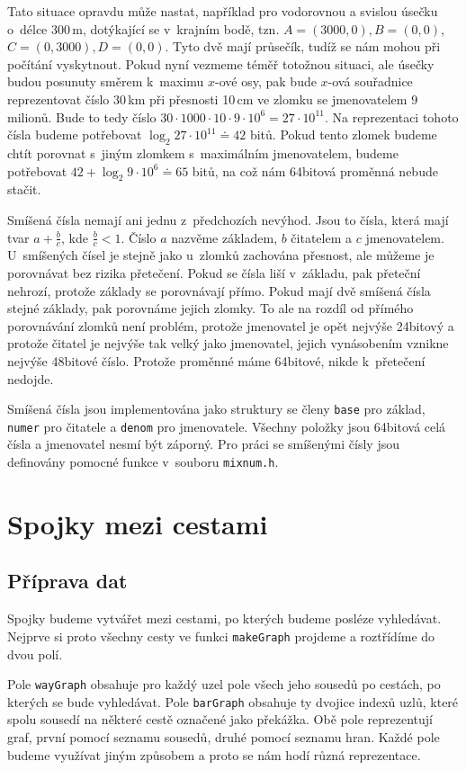 Tato situace opravdu může nastat, například pro vodorovnou a svislou úsečku
o~délce 300\,m, dotýkající se v~krajním bodě, tzn. $A=(3000,0),B=(0,0)$,
$C=(0,3000),D=(0,0)$. Tyto dvě mají průsečík, tudíž se nám mohou při počítání
vyskytnout. Pokud nyní vezmeme téměř totožnou situaci, ale úsečky budou posunuty
směrem k~maximu $x$-ové osy, pak bude $x$-ová souřadnice reprezentovat číslo
30\,km při přesnosti 10\,cm ve zlomku se jmenovatelem 9 milionů. Bude to tedy
číslo $30\cdot1000\cdot10\cdot9\cdot10^6=27 \cdot 10^{11}$. Na reprezentaci tohoto
čísla budeme potřebovat $\log_2 27\cdot 10^{11} \doteq 42$ bitů. Pokud tento
zlomek budeme chtít porovnat s~jiným zlomkem s~maximálním jmenovatelem, budeme
potřebovat $42 + \log_2 9\cdot 10^{6} \doteq 65$ bitů, na což nám 64bitová proměnná
nebude stačit.

{\tuc Smíšená čísla} nemají ani jednu z~předchozích nevýhod. Jsou to čísla,
která mají tvar $a+\frac{b}{c}$, kde $\frac{b}{c}<1$. Číslo $a$ nazvěme
základem, $b$ čitatelem a $c$ jmenovatelem. U~smíšených čísel je stejně jako
u~zlomků zachována přesnost, ale můžeme je porovnávat bez rizika přetečení.
Pokud se čísla liší v~základu, pak přeteční nehrozí, protože základy se
porovnávají přímo. Pokud mají dvě smíšená čísla stejné základy, pak porovnáme
jejich zlomky. To ale na rozdíl od přímého porovnávání zlomků není problém,
protože jmenovatel je opět nejvýše 24bitový a protože čitatel je nejvýše tak
velký jako jmenovatel, jejich vynásobením vznikne nejvýše 48bitové číslo.
Protože proměnné máme 64bitové, nikde k~přetečení nedojde.

Smíšená čísla jsou implementována jako struktury se členy \verb|base| pro
základ, \verb|numer| pro čitatele a \verb|denom| pro jmenovatele. Všechny
položky jsou 64bitová celá čísla a jmenovatel nesmí být záporný. Pro práci se
smíšenými čísly jsou definovány pomocné funkce v~souboru \verb|mixnum.h|.

\section{Spojky mezi cestami}
\subsection{Příprava dat}
Spojky budeme vytvářet mezi cestami, po kterých budeme posléze vyhledávat.
Nejprve si proto všechny cesty ve funkci \verb|makeGraph| projdeme a roztřídíme
do dvou polí. 

Pole \verb|wayGraph| obsahuje pro každý uzel pole všech jeho sousedů po cestách,
po kterých se bude vyhledávat. Pole \verb|barGraph| obsahuje ty dvojice indexů
uzlů, které spolu sousedí na některé cestě označené jako překážka. Obě pole
reprezentují graf, první pomocí seznamu sousedů, druhé pomocí seznamu hran.
Každé pole budeme využívat jiným způsobem a proto se nám hodí různá
reprezentace.

